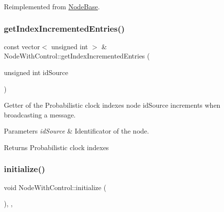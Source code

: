 Reimplemented from \hyperlink{class_node_base_a49052382add1123da26db6bfb687d254}{Node\+Base}.

\mbox{\label{class_node_with_control_acf1daba46cfa16eb2bd7cbd399c2624b}} 
\subsubsection{\texorpdfstring{get\+Index\+Incremented\+Entries()}{getIndexIncrementedEntries()}}
{\footnotesize\ttfamily const vector$<$ unsigned int $>$ \& Node\+With\+Control\+::get\+Index\+Incremented\+Entries (\begin{DoxyParamCaption}\item[{unsigned int}]{id\+Source }\end{DoxyParamCaption})\hspace{0.3cm}{\ttfamily [protected]}}



Getter of the Probabilistic clock indexes node id\+Source increments when broadcasting a message. 


\begin{DoxyParams}{Parameters}
{\em id\+Source} & Identificator of the node. \\
\hline
\end{DoxyParams}
\begin{DoxyReturn}{Returns}
Probabilistic clock indexes 
\end{DoxyReturn}
\mbox{\label{class_node_with_control_a08c8e80fd67b52c51c642d7c66fe729c}} 
\subsubsection{\texorpdfstring{initialize()}{initialize()}}
{\footnotesize\ttfamily void Node\+With\+Control\+::initialize (\begin{DoxyParamCaption}{ }\end{DoxyParamCaption})\hspace{0.3cm}{\ttfamily [override]}, {\ttfamily [protected]}, {\ttfamily [virtual]}}



